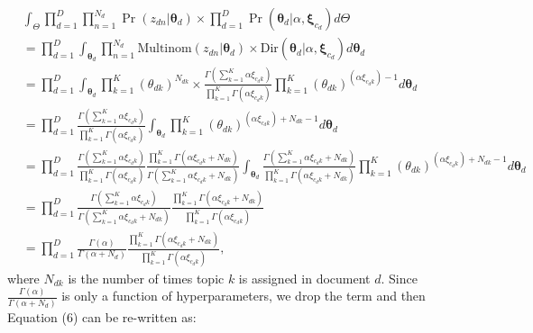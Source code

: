 \documentclass[12pt]{article}
\begin{document}
\begin{equation}
\begin{aligned}
&\int_{\Theta}\prod_{d=1}^D \prod_{n=1}^{N_d}\Pr(z_{dn}|\boldsymbol{\theta}_d) \times\prod_{d=1}^D \Pr(\boldsymbol{\theta}_d|\alpha, \boldsymbol{\xi}_{c_d}) d\Theta\\&
=\prod_{d=1}^D\int_{\boldsymbol{\theta}_d} \prod_{n=1}^{N_d}\mbox{Multinom}(z_{dn}|\boldsymbol{\theta}_d) \times \mbox{Dir}(\boldsymbol{\theta}_d|\alpha, \boldsymbol{\xi}_{c_d}) d\boldsymbol{\theta}_d \\& 
= \prod_{d=1}^D \int_{\boldsymbol{\theta}_d} \prod_{k=1}^K(\theta_{dk})^{N_{dk}}\times\frac{\Gamma(\sum_{k=1}^K \alpha \xi_{c_dk})}{\prod_{k=1}^K\Gamma(\alpha\xi_{c_dk})}\prod_{k=1}^K (\theta_{dk})^{(\alpha\xi_{c_dk})-1} d\boldsymbol{\theta}_d\\&
= \prod_{d=1}^D \frac{\Gamma(\sum_{k=1}^K \alpha \xi_{c_dk})}{\prod_{k=1}^K\Gamma(\alpha\xi_{c_dk})}\int_{\boldsymbol{\theta}_d} \prod_{k=1}^K (\theta_{dk})^{(\alpha\xi_{c_dk})+N_{dk}-1} d\boldsymbol{\theta}_d\\&
=\prod_{d=1}^D \frac{\Gamma(\sum_{k=1}^K \alpha \xi_{c_dk})}{\prod_{k=1}^K\Gamma(\alpha\xi_{c_dk})}\frac{\prod_{k=1}^K\Gamma(\alpha\xi_{c_dk}+N_{dk})}{\Gamma(\sum_{k=1}^K \alpha \xi_{c_dk}+N_{dk})}\int_{\boldsymbol{\theta}_d} \frac{\Gamma(\sum_{k=1}^K \alpha \xi_{c_dk}+N_{dk})}{\prod_{k=1}^K\Gamma(\alpha\xi_{c_dk}+N_{dk})}\prod_{k=1}^K (\theta_{dk})^{(\alpha\xi_{c_dk})+N_{dk}-1} d\boldsymbol{\theta}_d\\&
=\prod_{d=1}^D \frac{\Gamma(\sum_{k=1}^K \alpha \xi_{c_dk})}{\Gamma(\sum_{k=1}^K \alpha \xi_{c_dk}+N_{dk})}\frac{\prod_{k=1}^K\Gamma(\alpha\xi_{c_dk}+N_{dk})}{\prod_{k=1}^K\Gamma(\alpha\xi_{c_dk})}\\& =
\prod_{d=1}^D \frac{\Gamma(\alpha)}{\Gamma(\alpha+N_{d})}\frac{\prod_{k=1}^K\Gamma(\alpha\xi_{c_dk}+N_{dk})}{\prod_{k=1}^K\Gamma(\alpha\xi_{c_dk})},
\end{aligned}
\end{equation}
where $N_{dk}$ is the number of times topic $k$ is assigned in document $d$. Since $\frac{\Gamma(\alpha)}{\Gamma(\alpha+N_{d})}$ is only a function of hyperparameters, we drop the term and then Equation (6) can be re-written as:
\end{document}
